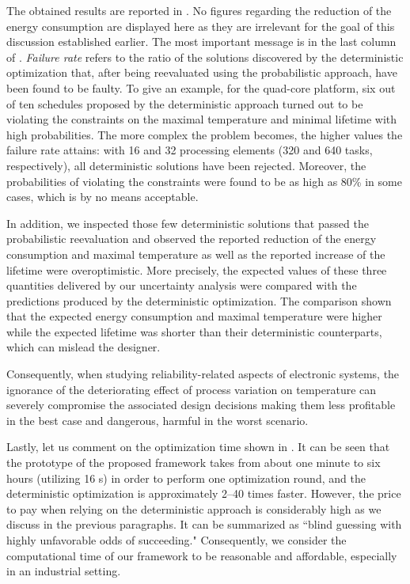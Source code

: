 The obtained results are reported in .
No figures regarding the reduction of the energy consumption are displayed here as they are irrelevant for the goal of this discussion established earlier.
The most important message is in the last column of .
\emph{Failure rate} refers to the ratio of the solutions discovered by the deterministic optimization that, after being reevaluated using the probabilistic approach, have been found to be faulty.
To give an example, for the quad-core platform, six out of ten schedules proposed by the deterministic approach turned out to be violating the constraints on the maximal temperature and minimal lifetime with high probabilities.
The more complex the problem becomes, the higher values the failure rate attains: with 16 and 32 processing elements (320 and 640 tasks, respectively), all deterministic solutions have been rejected.
Moreover, the probabilities of violating the constraints were found to be as high as 80\% in some cases, which is by no means acceptable.

In addition, we inspected those few deterministic solutions that passed the probabilistic reevaluation and observed the reported reduction of the energy consumption and maximal temperature as well as the reported increase of the lifetime were overoptimistic.
More precisely, the expected values of these three quantities delivered by our uncertainty analysis were compared with the predictions produced by the deterministic optimization.
The comparison shown that the expected energy consumption and maximal temperature were higher while the expected lifetime was shorter than their deterministic counterparts, which can mislead the designer.

Consequently, when studying reliability-related aspects of electronic systems, the ignorance of the deteriorating effect of process variation on temperature can severely compromise the associated design decisions making them less profitable in the best case and dangerous, harmful in the worst scenario.

Lastly, let us comment on the optimization time shown in .
It can be seen that the prototype of the proposed framework takes from about one minute to six hours (utilizing 16 s) in order to perform one optimization round, and the deterministic optimization is approximately 2--40 times faster.
However, the price to pay when relying on the deterministic approach is considerably high as we discuss in the previous paragraphs.
It can be summarized as ``blind guessing with highly unfavorable odds of succeeding."
Consequently, we consider the computational time of our framework to be reasonable and affordable, especially in an industrial setting.
